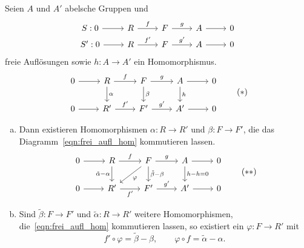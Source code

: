 \begin{lemma}
  Seien $A$ und $A'$ abelsche Gruppen und
  \begin{equation*}
    \begin{tikzcd}[row sep=tiny]
      S: 0  \arrow{r}{}  & R \arrow{r}{f}  & F \arrow{r}{g}  & A \arrow{r}{} & 0 \\
      S': 0 \arrow{r}{}  & R \arrow{r}{f'} & F \arrow{r}{g'} & A \arrow{r}{} & 0
    \end{tikzcd}
  \end{equation*}
  freie Auflösungen sowie $h\colon A \to A'$ ein Homomorphismus.
  \begin{equation*}
    \begin{tikzcd}
      0 \arrow{r}{} & R   \arrow{d}{\alpha}
                          \arrow{r}{f}  & F   \arrow{d}{\beta}
                                              \arrow{r}{g}  & A   \arrow{d}{h}
                                                                  \arrow{r}{} & 0 \\
      0 \arrow{r}{} & R'  \arrow{r}{f'} & F'  \arrow{r}{g'} & A'  \arrow{r}{} & 0 
    \end{tikzcd}
    \tag{$*$}\label{eqn:frei_aufl_hom}
  \end{equation*}
  \begin{enumerate}[(a)]
    \item 
      Dann existieren Homomorphismen $\alpha \colon R \to R'$ und $\beta \colon F \to F'$, die das Diagramm~\eqref{eqn:frei_aufl_hom} kommutieren lassen.
      \begin{equation*}
        \begin{tikzcd}
      0 \arrow{r}{} & R   \arrow[swap]{d}{\tilde\alpha - \alpha}
                          \arrow{r}{f}  & F   \arrow{d}{\tilde\beta - \beta}
                                              \arrow{dl}{\varphi}
                                              \arrow{r}{g}  & A   \arrow{d}{h-h = 0}
                                                                  \arrow{r}{} & 0 \\
      0 \arrow{r}{} & R'  \arrow[swap]{r}{f'} & F'  \arrow{r}{g'} & A'  \arrow{r}{} & 0 
        \end{tikzcd}
        \tag{$**$}\label{eqn:frei_aufl_homotopie}
      \end{equation*}
    \item
      Sind $\tilde\beta \colon F \to F'$ und $\tilde\alpha \colon R \to R'$ weitere Homomorphismen, die~\eqref{eqn:frei_aufl_hom} kommutieren lassen, so existiert ein $\varphi \colon F \to R'$ mit
      \begin{equation*}
        f' \circ \varphi = \tilde\beta - \beta, \qquad \varphi \circ f = \tilde\alpha - \alpha.
      \end{equation*}
  \end{enumerate}
\end{lemma}
